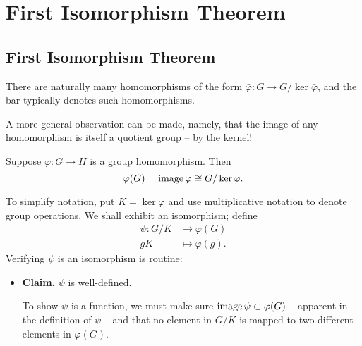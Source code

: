 \documentclass[../algebraNotesMSRI-UP2016.tex]{subfiles}
\begin{document}
\section[\S \thesection]{First Isomorphism Theorem}\label{sec:2p8firstIsomorphismTheorem}
\subsection[\subsecname]{First Isomorphism Theorem}
\begin{frame}{\subsecname}
There are naturally many homomorphisms of the form $\bar{\varphi}:G\to G/\ker{\bar{\varphi}}$, and the bar typically denotes such homomorphisms.  

\smallGap
A more general observation can be made, namely, that the image of any homomorphism is itself a quotient group -- by the kernel! 

\smallGap
\begin{thm}\label{thm:firstIsomorphismTheorem}
Suppose $\varphi: G\to H$ is a group homomorphism.  Then 
\[
\varphi(G)=\operatorname{image}{\varphi}\cong G/\ker{\varphi}.
\]
\end{thm}
\end{frame}

\begin{frame}
\bigProof
To simplify notation, put $K=\ker{\varphi}$ and use multiplicative notation to denote group operations.  We shall exhibit an isomorphism; define
\begin{align*}
\psi:G/K &\to \varphi(G) \\
gK &\mapsto \varphi(g).
\end{align*}
Verifying $\psi$ is an isomorphism is routine:
\begin{itemize}
\item \textbf{Claim.} $\psi$ is well-defined.

\smallGap
\pf To show $\psi$ is a function, we must make sure $\operatorname{image}{\psi}\subset \varphi(G)$ -- apparent in the definition of $\psi$ -- and that no element in $G/K$ is mapped to two different elements in $\varphi(G)$.
\end{itemize}
\end{frame}
\end{document}
